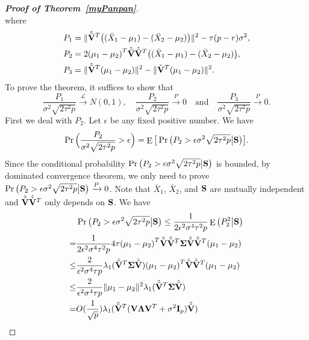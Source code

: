 \documentclass[3p]{elsarticle}
\DeclareMathOperator{\myE}{E}
\theoremstyle{plain}
\theoremstyle{definition}
\theoremstyle{remark}
\begin{document}
\begin{appendices}
\begin{proof}[\textbf{Proof of Theorem~\ref{myPanpan}}]
\begin{equation*}
\end{equation*}
where
\begin{align*}
    P_1&=\|\hat{\tilde{\mathbf{V}}}^T\big((\bar{X}_1-\mu_1)-(\bar{X}_2-\mu_2)\big)\|^2- \tau (p-r)\sigma^2,\\
    P_2&=2{(\mu_1-\mu_2)}^T \hat{\tilde{\mathbf{V}}}\hat{\tilde{\mathbf{V}}}^T\big((\bar{X}_1-\mu_1)-(\bar{X}_2-\mu_2)\big),\\
    P_3&=\|\hat{\tilde{\mathbf{V}}}^T(\mu_1-\mu_2)\|^2-\|\tilde{\mathbf{V}}^T(\mu_1-\mu_2)\|^2.
\end{align*}
To prove the theorem, it suffices to show that
$$
    \frac{P_1}{\sigma^2\sqrt{2\tau^2 p}}\xrightarrow{\mathcal{L}} N(0,1),
    \quad
    \frac{P_2}{\sigma^2\sqrt{2\tau^2 p}}\xrightarrow{P} 0
    \quad
    \textrm{and}
    \quad
    \frac{P_3}{\sigma^2\sqrt{2\tau^2 p}}\xrightarrow{P}0.
    $$
   First we deal with $P_2$.
   Let $\epsilon$ be any fixed positive number. 
   We have
   $$
   \Pr\Big(\frac{P_2}{\sigma^2\sqrt{2\tau^2 p}}>\epsilon\Big)
   =
   \myE\big[\Pr\big({P_2}>\epsilon{\sigma^2\sqrt{2\tau^2 p}}\big|\BS\big)\big].
   $$
   Since the conditional probability 
   $
   \Pr\big({P_2}>\epsilon{\sigma^2\sqrt{2\tau^2 p}}\big|\mathbf{S}\big)
   $
   is bounded, by dominated convergence theorem, we only need to prove
   $\Pr\big({P_2}>\epsilon{\sigma^2\sqrt{2\tau^2 p}}\big|\mathbf{S}\big)\xrightarrow{P}0$.
    Note that $\bar{X}_1$, $\bar{X}_2$, and $\mathbf{S}$ are mutually independent and $\hat{\tilde{\mathbf{V}}}\hat{\tilde{\mathbf{V}}}^T$ only depends on $\mathbf{S}$.
    We have
    \begin{equation*}
        \begin{aligned}
            &\Pr\big({P_2}>\epsilon{\sigma^2\sqrt{2\tau^2 p}}\big|\BS\big)\leq
            \frac{1}{2\epsilon^2\sigma^4\tau^2 p}\myE \big(P_2^2\big|\BS\big)\\
            =&\frac{1}{2\epsilon^2\sigma^4\tau^2 p} 4\tau {(\mu_1-\mu_2)}^T \hat{\tilde{\BV}}\hat{\tilde{\BV}}^T\bSigma \hat{\tilde{\BV}}\hat{\tilde{\BV}}^T(\mu_1-\mu_2)\\
            \leq &
            \frac{2}{\epsilon^2\sigma^4\tau p}
             \lambda_1(\hat{\tilde{\BV}}^T\bSigma \hat{\tilde{\BV}}) {(\mu_1-\mu_2)}^T \hat{\tilde{\BV}}\hat{\tilde{\BV}}^T(\mu_1-\mu_2)\\
            \leq & 
\frac{2}{\epsilon^2\sigma^4\tau p}
             \|\mu_1-\mu_2\|^2
             \lambda_1(\hat{\tilde{\BV}}^T\bSigma \hat{\tilde{\BV}})\\
             =&
             O(\frac{1}{\sqrt{p}})
             \lambda_1(\hat{\tilde{\BV}}^T (\BV\bLambda \BV^T +\sigma^2 \BI_p) \hat{\tilde{\BV}})\\

\end{aligned}
\end{equation*}
\end{proof}
\end{appendices}
\end{document}
